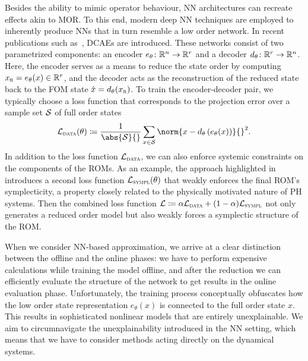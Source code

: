 Besides the ability to mimic operator behaviour, \ac{NN} architectures can recreate effects akin to \ac{MOR}.
To this end, modern deep \ac{NN} techniques are employed to inherently produce \acp{NN} that in turn resemble a low order network.
In recent publications such as~\cite{Lee2020, Salvador2021, Benner2022, Kim2022, Buchfink2023}, \acp{DCAE} are introduced.
These networks consist of two parametrized components: an encoder $e_\theta \colon \mathbb{R}^n \to \mathbb{R}^r$ and a decoder $d_\theta \colon \mathbb{R}^r \to \mathbb{R}^n$.
Here, the encoder serves as a means to reduce the state order by computing $x_{\textnormal{\scshape r}} = e_\theta(x) \in \mathbb{R}^r$, and the decoder acts as the reconstruction of the reduced state back to the \ac{FOM} state $\hat{x} = d_\theta(x_{\textnormal{\scshape r}})$.
To train the encoder-decoder pair, we typically choose a loss function that corresponds to the projection error over a sample set $\mathcal{S}$ of full order states
\begin{equation}\label{eq:reduction-loss}
    \mcl{L}_{\msc{data}}(\theta) \coloneqq \frac{1}{\abs{\mcl{S}}{}} \sum\limits_{x \in \mcl{S}} \norm{x - d_\theta\left( e_\theta(x) \right)}{}^2.
\end{equation}
In addition to the loss function $\mathcal{L}_{\textnormal{\scshape data}}$, we can also enforce systemic constraints on the components of the \acp{ROM}.
As an example, the approach highlighted in~\cite{Buchfink2023} introduces a second loss function $\mathcal{L}_{\textnormal{\scshape sympl}}(\theta)$ that weakly enforces the final \ac{ROM}'s symplecticity, a property closely related to the physically motivated nature of \ac{PH} systems.
Then the combined loss function $\mathcal{L} \coloneqq \alpha \mathcal{L}_{\textnormal{\scshape data}} + (1 - \alpha) \mathcal{L}_{\textnormal{\scshape sympl}}$ not only generates a reduced order model but also weakly forces a symplectic structure of the \ac{ROM}.

When we consider \ac{NN}-based approximation, we arrive at a clear distinction between the offline and the online phases: we have to perform expensive calculations while training the model offline, and after the reduction we can efficiently evaluate the structure of the network to get results in the online evaluation phase.
Unfortunately, the training process conceptually obfuscates how the low order state representation $e_\theta(x)$ is connected to the full order state $x$.
This results in sophisticated nonlinear models that are entirely unexplainable.
We aim to circumnavigate the unexplainability introduced in the \ac{NN} setting, which means that we have to consider methods acting directly on the dynamical systems.
